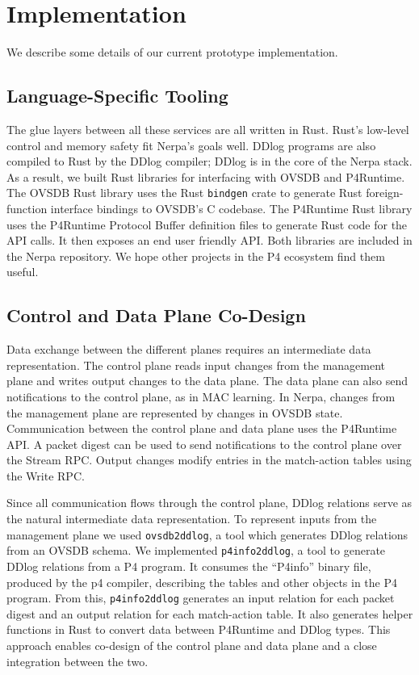 \documentclass[sigconf, nonacm]{acmart}
\begin{document}
\section{Implementation}
We describe some details of our current prototype implementation.

\subsection{Language-Specific Tooling}
The glue layers between all these services are all written in Rust. Rust's low-level control and memory safety fit Nerpa's goals well. DDlog
programs are also compiled to Rust by the DDlog compiler; DDlog is in the core of the Nerpa stack. As a result, we built Rust libraries for interfacing with OVSDB and P4Runtime.
The OVSDB Rust library uses the Rust \texttt{bindgen} crate to generate Rust foreign-function interface bindings to OVSDB’s C codebase.
The P4Runtime Rust library uses the P4Runtime Protocol Buffer definition files to generate Rust code for the API calls. It then exposes an end user friendly API. Both libraries are included in the Nerpa repository. We hope other projects in the P4 ecosystem find them useful.

\subsection{Control and Data Plane Co-Design}

Data exchange between the different planes requires an intermediate data representation.
The control plane reads input changes from the management plane and writes output changes to the data plane. The data plane can also send notifications to the control plane, as in MAC learning. In Nerpa, changes from the management plane are represented by changes in OVSDB state. Communication between the control plane and data plane uses the P4Runtime API. A packet digest can be used to send notifications to the control plane over the Stream RPC. Output changes modify entries in the match-action tables using the Write RPC.

Since all communication flows through the control plane, DDlog relations serve as the natural intermediate data representation. To represent inputs from the management plane we used \texttt{ovsdb2ddlog}, a tool which generates DDlog relations from an OVSDB schema. We
implemented \texttt{p4info2ddlog}, a tool to generate DDlog relations from a P4 program. It consumes the ``P4info'' binary file,
produced by the p4 compiler, describing the tables and other objects in the P4 program. From this, \texttt{p4info2ddlog}
generates an input relation for each packet digest and an output relation for each match-action table.
It also generates helper functions in Rust to convert data between P4Runtime and DDlog types.
This approach enables co-design of the control plane and data plane and a close integration between the two.
\end{document}
